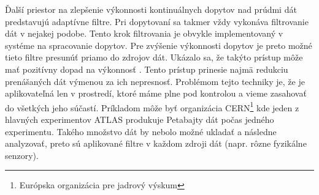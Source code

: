 \par
Ďalší priestor na zlepšenie výkonnosti kontinuálnych dopytov nad prúdmi dát predstavujú adaptívne filtre. Pri dopytovaní sa takmer vždy vykonáva filtrovanie dát v nejakej podobe. Tento krok filtrovania je obvykle implementovaný v systéme na spracovanie dopytov. Pre zvýšenie výkonnosti dopytov je preto možné tieto filtre presunúť priamo do zdrojov dát. Ukázalo sa, že takýto prístup môže mať pozitívny dopad na výkonnosť \citep{olston2003adaptive}. Tento prístup prinesie najmä redukciu prenášaných dát výmenou za ich nepresnosť. Problémom tejto techniky je, že je aplikovateľná len v prostredí, ktoré máme plne pod kontrolou a vieme zasahovať do všetkých jeho súčastí. Príkladom môže byť organizácia CERN\footnote{Európska organizácia pre jadrový výskum} kde jeden z hlavných experimentov ATLAS produkuje Petabajty dát počas jedného experimentu. Takého množstvo dát by nebolo možné ukladať a následne analyzovať, preto sú aplikované filtre v každom zdroji dát (napr. rôzne fyzikálne senzory).




